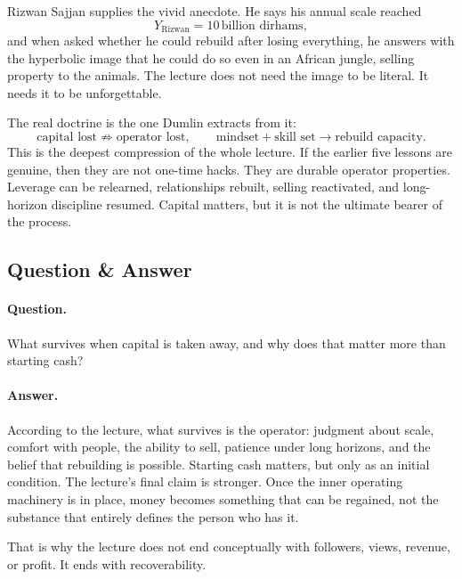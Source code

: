 Rizwan Sajjan supplies the vivid anecdote. He says his annual scale reached
\begin{equation}
Y_{\text{Rizwan}} = 10\,\text{billion dirhams},
\end{equation}
and when asked whether he could rebuild after losing everything, he answers with the hyperbolic image that he could do so even in an African jungle, selling property to the animals. The lecture does not need the image to be literal. It needs it to be unforgettable.

The real doctrine is the one Dumlin extracts from it:
\begin{equation}
\text{capital lost} \not\Rightarrow \text{operator lost},
\qquad
\text{mindset} + \text{skill set} \to \text{rebuild capacity}.
\end{equation}
This is the deepest compression of the whole lecture. If the earlier five lessons are genuine, then they are not one-time hacks. They are durable operator properties. Leverage can be relearned, relationships rebuilt, selling reactivated, and long-horizon discipline resumed. Capital matters, but it is not the ultimate bearer of the process.

\subsection{Question \& Answer}

\paragraph{Question.} What survives when capital is taken away, and why does that matter more than starting cash?

\paragraph{Answer.} According to the lecture, what survives is the operator: judgment about scale, comfort with people, the ability to sell, patience under long horizons, and the belief that rebuilding is possible. Starting cash matters, but only as an initial condition. The lecture's final claim is stronger. Once the inner operating machinery is in place, money becomes something that can be regained, not the substance that entirely defines the person who has it.

That is why the lecture does not end conceptually with followers, views, revenue, or profit. It ends with recoverability.

